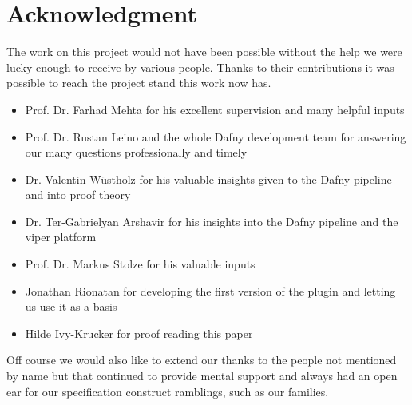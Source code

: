 \section{Acknowledgment}
The work on this project would not have been possible without the help we were lucky enough to receive by various people. Thanks to their contributions it was possible to reach the project stand this work now has.

\begin{itemize}
	\item Prof. Dr. Farhad Mehta for his excellent supervision and many helpful inputs
	\item Prof. Dr. Rustan Leino and the whole Dafny development team for answering our many questions professionally and timely
	\item Dr. Valentin Wüstholz for his valuable insights given to the Dafny pipeline and into proof theory 
	\item Dr. Ter-Gabrielyan Arshavir for his insights into the Dafny pipeline and the viper platform
	\item Prof. Dr. Markus Stolze for his valuable inputs
	\item Jonathan Rionatan for developing the first version of the plugin and letting us use it as a basis
	\item Hilde Ivy-Krucker for proof reading this paper
\end{itemize}
Off course we would also like to extend our thanks to the people not mentioned by name but that continued to provide mental support and always had an open ear for our specification construct ramblings, such as our families. 